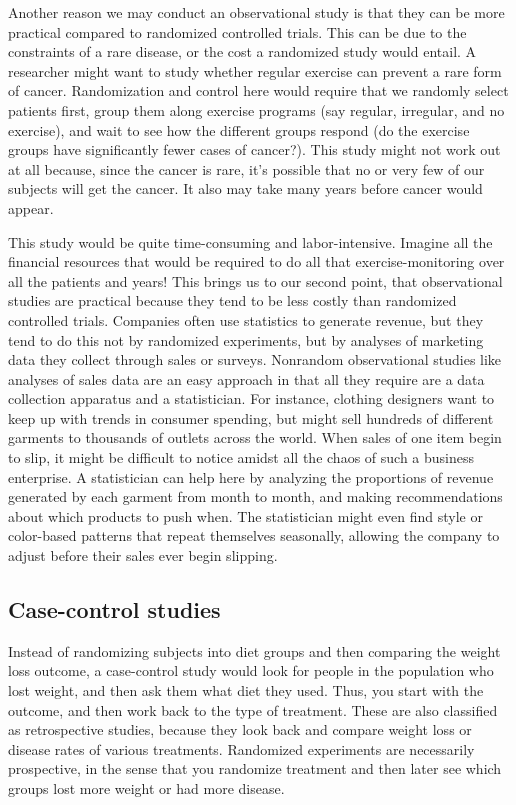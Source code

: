 \documentclass[11pt, chapterprefix=true]{scrbook}\usepackage[]{graphicx}\usepackage[]{color}
\begin{document}
Another reason we may conduct an observational study is that they can be more practical compared to randomized controlled trials. This can be due to the constraints of a rare disease, or the cost a randomized study would entail.  A researcher might want to study whether regular exercise can prevent a rare form of cancer.  Randomization and control here would require that we randomly select patients first, group them along exercise programs (say regular, irregular, and no exercise), and wait to see how the different groups respond (do the exercise groups have significantly fewer cases of cancer?).  This study might not work out at all because, since the cancer is rare, it's possible that no or very few of our subjects will get the cancer.  It also may take many years before cancer would appear.

This study would be quite time-consuming and labor-intensive. Imagine all the financial resources that would be required to do all that exercise-monitoring over all the patients and years! This brings us to our second point, that observational studies are practical because they tend to be less costly than randomized controlled trials. Companies often use statistics to generate revenue, but they tend to do this not by randomized experiments, but by analyses of marketing data they collect through sales or surveys. Nonrandom observational studies like analyses of sales data are an easy approach in that all they require are a data collection apparatus and a statistician. For instance, clothing designers want to keep up with trends in consumer spending, but might sell hundreds of different garments to thousands of outlets across the world. When sales of one item begin to slip, it might be difficult to notice amidst all the chaos of such a business enterprise. A statistician can help here by analyzing the proportions of revenue generated by each garment from month to month, and making recommendations about which products to push when. The statistician might even find style or color-based patterns that repeat themselves seasonally, allowing the company to adjust before their sales ever begin slipping.

\subsection{Case-control studies}

Instead of randomizing subjects into diet groups and then comparing the weight loss outcome, a case-control study would look for people in the population who lost weight, and then ask them what diet they used.  Thus, you start with the outcome, and then work back to the type of treatment.  These are also classified as retrospective studies, because they look back and compare weight loss or disease rates of various treatments.  Randomized experiments are necessarily prospective, in the sense that you randomize treatment and then later see which groups lost more weight or had more disease.
\end{document}

